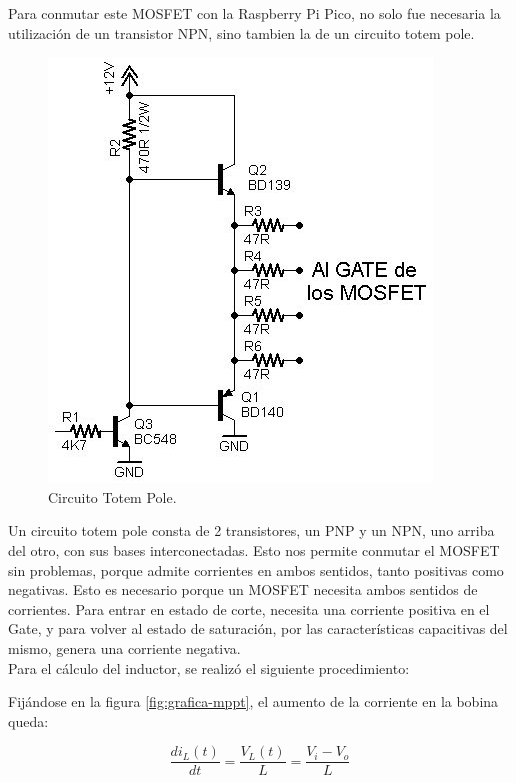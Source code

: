 Para conmutar este MOSFET con la Raspberry Pi Pico, no solo fue necesaria la utilización de un transistor NPN, sino tambien la de un circuito totem pole. \\

\begin{figure}[H]
    \centering
    \includegraphics[width=0.8\linewidth]{MPPT/Imagen de WhatsApp 2023-10-11 a las 20.57.02_7faa2d47.jpg}
    \caption{Circuito Totem Pole.}
    \label{fig:enter-label}
\end{figure}

Un circuito totem pole consta de 2 transistores, un PNP y un NPN, uno arriba del otro, con sus bases interconectadas. Esto nos permite conmutar el MOSFET sin problemas, porque admite corrientes en ambos sentidos, tanto positivas como negativas. Esto es necesario porque un MOSFET necesita ambos sentidos de corrientes. Para entrar en estado de corte, necesita una corriente positiva en el Gate, y para volver al estado de saturación, por las características capacitivas del mismo, genera una corriente negativa.\\

Para el cálculo del inductor, se realizó el siguiente procedimiento:

Fijándose en la figura \ref{fig:grafica-mppt}, el aumento de la corriente en la bobina queda:

\begin{equation}
\frac{di_L(t)}{dt} = \frac{V_L(t)}{L} = \frac{V_i - V_o}{L}    
\end{equation}

